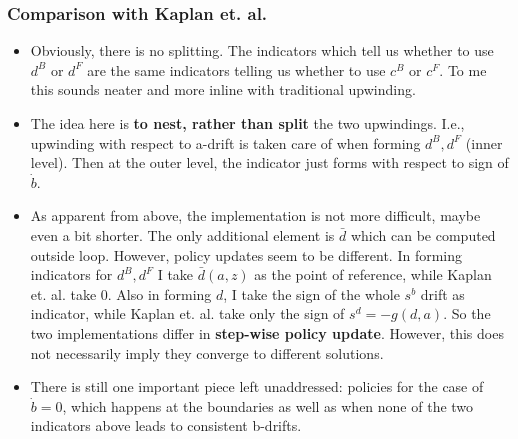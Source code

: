 \documentclass[11pt]{article}
\begin{document}
\subsubsection{Comparison with Kaplan et. al.}
\label{sec:orgab1cd51}
\begin{itemize}
\item Obviously, there is no splitting. The indicators which tell us whether to use \(d^B\) or \(d^F\) are the same indicators telling us whether to use \(c^B\) or \(c^F\). To me this sounds neater and more inline with traditional upwinding.
\item The idea here is \textbf{to nest, rather than split} the two upwindings. I.e., upwinding with respect to a-drift is taken care of when forming \(d^B, d^F\) (inner level). Then at the outer level, the indicator just forms with respect to sign of \(\dot{b}\).
\item As apparent from above, the implementation is not more difficult, maybe even a bit shorter. The only additional element is \(\bar{d}\) which can be computed outside loop. However, policy updates seem to be different. In forming indicators for \(d^B, d^F\) I take \(\bar{d}(a,z)\) as the point of reference, while Kaplan et. al. take 0. Also in forming \(d\), I take the sign of the whole \(s^b\) drift as indicator, while Kaplan et. al. take only the sign of \(s^d = -g(d,a)\). So the two implementations differ in \textbf{step-wise policy update}. However, this does not necessarily imply they converge to different solutions.
\item There is still one important piece left unaddressed: policies for the case of \(\dot{b} = 0\), which happens at the boundaries as well as when none of the two indicators above leads to consistent b-drifts.
\end{itemize}
\end{document}
